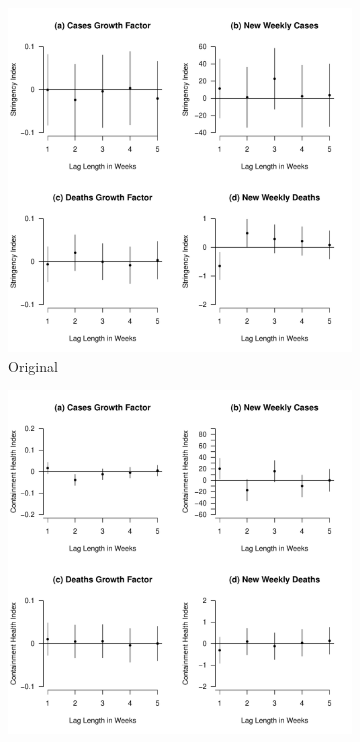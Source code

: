 \documentclass[12pt,letterpaper]{article}
\begin{document}
	\begin{figure}[p]
		\centering
		\begin{subfigure}[t]{0.6\textwidth}
			\centering
			\includegraphics[width=\textwidth]{si.pdf}
			\caption{Original}
			\label{fig:si}
		\end{subfigure}
		\vspace{0.5cm} %
		\begin{subfigure}[b]{0.48\textwidth}
			\centering
			\includegraphics[width=\textwidth]{asi.pdf}

\end{subfigure}
\end{figure}
\end{document}
